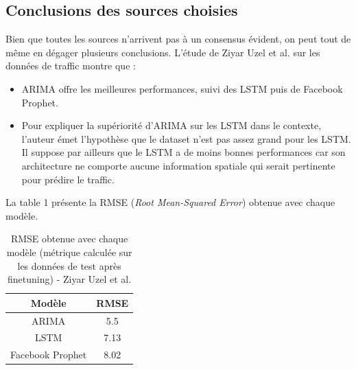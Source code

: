 \documentclass[french]{article}
\begin{document}
    \subsection{Conclusions des sources choisies}
    Bien que toutes les sources n'arrivent pas à un consensus évident, on peut tout de même en dégager plusieurs conclusions.
    L'étude de Ziyar Uzel et al.\cite{uzel} sur les données de traffic montre que :
    \begin{itemize}
        \item ARIMA offre les meilleures performances, suivi des LSTM puis de Facebook Prophet.
        \item Pour expliquer la supériorité d'ARIMA sur les LSTM dans le contexte, l'auteur émet l'hypothèse que le dataset n'est pas assez grand pour les LSTM. Il suppose par ailleurs que le LSTM a de moins bonnes performances car son architecture ne comporte aucune information spatiale qui serait pertinente pour prédire le traffic.
    \end{itemize}
    La table 1 présente la RMSE (\textit{Root Mean-Squared Error}) obtenue avec chaque modèle.
    \begin{table}[h!]
        \begin{center}
            \begin{tabular}{ |c|c| }
                \hline
                Modèle & RMSE \\
                \hline
                ARIMA & 5.5 \\ 
                \hline
                LSTM & 7.13 \\  
                \hline
                Facebook Prophet & 8.02 \\
                \hline
            \end{tabular}
            \caption{RMSE obtenue avec chaque modèle (métrique calculée sur les données de test après finetuning) - Ziyar Uzel et al.}
            \label{table:1}
        \end{center}
    \end{table}
    
\end{document}
